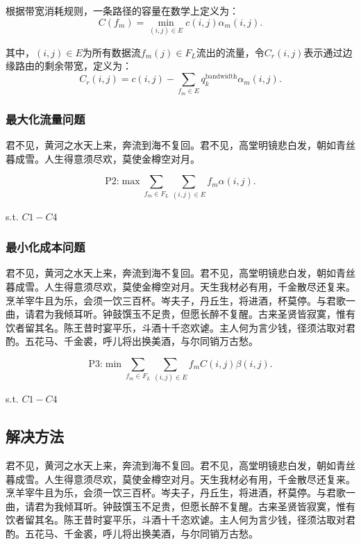 \documentclass[a4paper, UTF8]{ctexart}
\begin{document}
\begin{multicols}{2}
	根据带宽消耗规则，一条路径的容量在数学上定义为：
	$$C(f_m)=\min_{(i,j)\in E}c(i,j)\alpha_m(i,j).$$
	
	其中，$(i,j)\in E$为所有数据流$f_m(j)\in F_L$流出的流量，令$C_r(i,j)$表示通过边缘路由的剩余带宽，定义为：
	$$C_r(i,j)=c(i,j)-\sum_{f_m\in E}q_k^\text{bandwidth}{ \alpha _ m }(i,j).$$
	
	\subsubsection{最大化流量问题}
	
	君不见，黄河之水天上来，奔流到海不复回。君不见，高堂明镜悲白发，朝如青丝暮成雪。人生得意须尽欢，莫使金樽空对月。
	
	$$\text{P2:}\max\sum_{f_m\in F_L}\sum_{(i,j)\in E}f_m\alpha(i,j). $$
	
	s.t. $C1-C4$
	
	\subsubsection{最小化成本问题}
	
	君不见，黄河之水天上来，奔流到海不复回。君不见，高堂明镜悲白发，朝如青丝暮成雪。人生得意须尽欢，莫使金樽空对月。天生我材必有用，千金散尽还复来。烹羊宰牛且为乐，会须一饮三百杯。岑夫子，丹丘生，将进酒，杯莫停。与君歌一曲，请君为我倾耳听。钟鼓馔玉不足贵，但愿长醉不复醒。古来圣贤皆寂寞，惟有饮者留其名。陈王昔时宴平乐，斗酒十千恣欢谑。主人何为言少钱，径须沽取对君酌。五花马、千金裘，呼儿将出换美酒，与尔同销万古愁。
	
	$$\text{P3:}\min\sum_{f_m\in F_L}\sum_{(i,j)\in E}f_mC(i,j)\beta(i,j). $$
	
	s.t. $C1-C4$
	
	\subsection{解决方法}%
	
	君不见，黄河之水天上来，奔流到海不复回。君不见，高堂明镜悲白发，朝如青丝暮成雪。人生得意须尽欢，莫使金樽空对月。天生我材必有用，千金散尽还复来。烹羊宰牛且为乐，会须一饮三百杯。岑夫子，丹丘生，将进酒，杯莫停。与君歌一曲，请君为我倾耳听。钟鼓馔玉不足贵，但愿长醉不复醒。古来圣贤皆寂寞，惟有饮者留其名。陈王昔时宴平乐，斗酒十千恣欢谑。主人何为言少钱，径须沽取对君酌。五花马、千金裘，呼儿将出换美酒，与尔同销万古愁。
		

\end{multicols}
\end{document}
